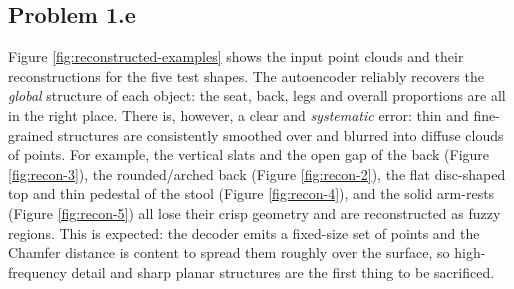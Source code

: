 \documentclass{article}
\begin{document}
\newpage
\subsection*{Problem 1.e}
Figure \ref{fig:reconstructed-examples} shows the input point clouds and their reconstructions for the five test shapes. The autoencoder reliably recovers the \emph{global} structure of each object: the seat, back, legs and overall proportions are all in the right place. There is, however, a clear and \emph{systematic} error: thin and fine-grained structures are consistently smoothed over and blurred into diffuse clouds of points. For example, the vertical slats and the open gap of the back (Figure \ref{fig:recon-3}), the rounded/arched back (Figure \ref{fig:recon-2}), the flat disc-shaped top and thin pedestal of the stool (Figure \ref{fig:recon-4}), and the solid arm-rests (Figure \ref{fig:recon-5}) all lose their crisp geometry and are reconstructed as fuzzy regions. This is expected: the decoder emits a fixed-size set of points and the Chamfer distance is content to spread them roughly over the surface, so high-frequency detail and sharp planar structures are the first thing to be sacrificed.
\end{document}

